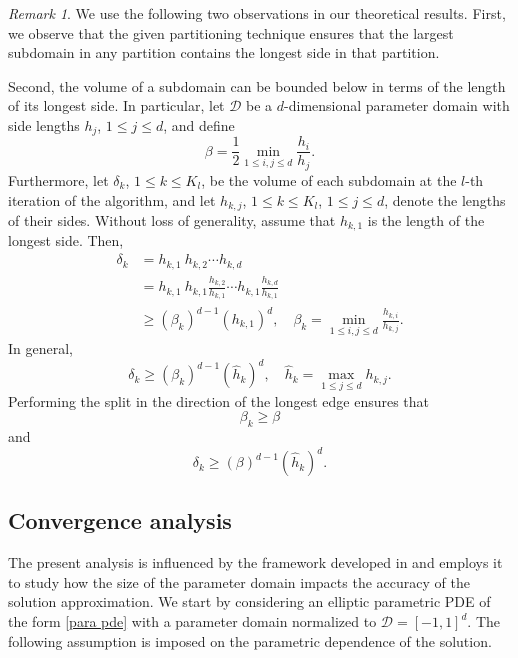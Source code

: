 \documentclass[12pt]{article}
\theoremstyle{remark}
\newtheorem{remark}{Remark}[section]
\theoremstyle{definition}
\numberwithin{equation}{section}
\begin{document}
\begin{remark}
    We use the following two observations in our theoretical results. First, we observe that the given partitioning technique ensures that the largest subdomain in any partition contains the longest side in that partition.
    
    Second, the volume of a subdomain can be bounded below in terms of the length of its longest side. In particular, let $\mathcal{D}$ be a $d$-dimensional parameter domain with side lengths $h_j$, $1 \leq j \leq d$, and define
    \begin{equation}
        \beta=\frac{1}{2}\min_{1 \leq i , j \leq d} \frac{h_{i}}{h_{j}}.
    \end{equation}
    Furthermore, let $\delta_k$, $1 \leq k \leq K_l$, be the volume of each subdomain at the $l$-th iteration of the algorithm, and let $h_{k,j}$, $1 \leq k \leq K_l$, $1 \leq j \leq d$, denote the lengths of their sides. Without loss of generality, assume that $h_{k,1}$ is the length of the longest side. Then,
    \begin{align}
        \delta_k &= h_{k,1} \ h_{k,2} \cdots h_{k,d}\\
        &= h_{k,1} \ h_{k,1} \frac{h_{k,2}}{h_{k,1}} \cdots h_{k,1} \frac{h_{k,d}}{h_{k,1}}\\
        &\geq (\beta_k)^{d-1} (h_{k,1})^d, \quad \beta_k=\min_{1 \leq i , j \leq d} \frac{h_{k,i}}{h_{k,j}}.
    \end{align}
    In general,
    \begin{equation*}
        \delta_k \geq (\beta_k)^{d-1} (\hat{h}_k)^d, \quad \hat{h}_k= \max_{1\leq j\leq d} h_{k,j}.
    \end{equation*}
    Performing the split in the direction of the longest edge ensures that
    \begin{equation}
        \beta_k \geq \beta
    \end{equation}
    and
    \begin{equation}
        \delta_k \geq (\beta)^{d-1} (\hat{h}_k)^d.
        \label{beta}
    \end{equation}
    \label{rem geo}
\end{remark}



\subsection{Convergence analysis}
The present analysis is influenced by the framework developed in \cite{cohen2015approximation} and employs it to study how the size of the parameter domain impacts the accuracy of the solution approximation.
We start by considering an elliptic parametric PDE of the form \eqref{para pde} with a parameter domain normalized to $\mathcal{D} = [-1,1]^d$. The following assumption is imposed on the parametric dependence of the solution.
\end{document}
